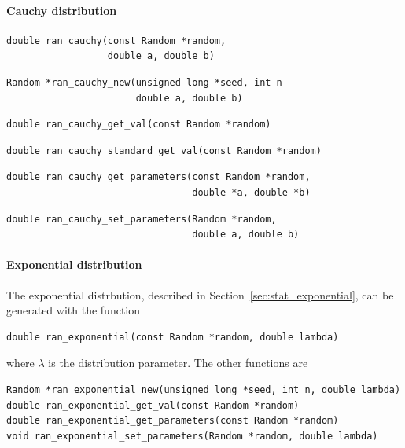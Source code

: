\paragraph{Cauchy distribution}

\begin{verbatim}
double ran_cauchy(const Random *random,
                  double a, double b)
\end{verbatim}
\begin{verbatim}
Random *ran_cauchy_new(unsigned long *seed, int n
                       double a, double b)
\end{verbatim}
\begin{verbatim}
double ran_cauchy_get_val(const Random *random)
\end{verbatim}
\begin{verbatim}
double ran_cauchy_standard_get_val(const Random *random)
\end{verbatim}
\begin{verbatim}
double ran_cauchy_get_parameters(const Random *random,
                                 double *a, double *b)
\end{verbatim}
\begin{verbatim}
double ran_cauchy_set_parameters(Random *random,
                                 double a, double b)
\end{verbatim}




\paragraph{Exponential distribution}

The exponential distrbution, described in
Section~\ref{sec:stat_exponential}, can be generated with the
function
\begin{verbatim}
double ran_exponential(const Random *random, double lambda)
\end{verbatim}
where $\lambda$ is the distribution parameter.
The other functions are
\begin{verbatim}
Random *ran_exponential_new(unsigned long *seed, int n, double lambda)
double ran_exponential_get_val(const Random *random)
double ran_exponential_get_parameters(const Random *random)
void ran_exponential_set_parameters(Random *random, double lambda)
\end{verbatim}

